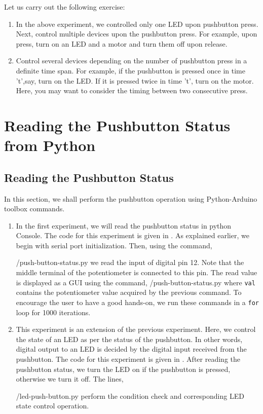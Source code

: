 \begin{exercise}
Let us carry out the following exercise:
\begin{enumerate}
\item In the above experiment, we controlled only one LED upon
  pushbutton press. Next, control multiple devices upon the pushbutton
  press. For example, upon press, turn on an LED and a motor and turn
  them off upon release.
\item Control several devices depending on the number of pushbutton
  press in a definite time span. For example, if the pushbutton is
  pressed once in time 't',say, turn on the LED. If it is pressed
  twice in time 't', turn on the motor. Here, you may want to consider
  the timing between two consecutive press.
\end{enumerate}
\end{exercise}

\section{Reading the Pushbutton Status from Python}
\subsection{Reading the Pushbutton Status}
In this section, we shall perform the pushbutton operation using
Python-Arduino toolbox commands.
\begin{enumerate}
\item In the first experiment, we will read the pushbutton status in
  python Console. The code for this experiment is given in
  . As explained earlier, we begin with serial
  port initialization. Then, using the command,
  
  {\LocPushpycode/push-button-status.py} we read the input of
  digital pin 12. Note that the middle terminal of the potentiometer
  is connected to this pin. The read value is displayed as a GUI using
  the command, 
  {\LocPushpycode/push-button-status.py} where {\tt val} contains
  the potentiometer value acquired by the previous command. To
  encourage the user to have a good hands-on, we run these commands in
  a {\tt for} loop for 1000 iterations.

\item This experiment is an extension of the previous
  experiment. Here, we control the state of an LED as per the status
  of the pushbutton. In other words, digital output to an LED is
  decided by the digital input received from the pushbutton. The code
  for this experiment is given in . After reading
  the pushbutton status, we turn the LED on if the pushbutton is
  pressed, otherwise we turn it off. The lines,
  
  {\LocPushpycode/led-push-button.py} perform the condition check
  and corresponding LED state control operation.
\end{enumerate}

